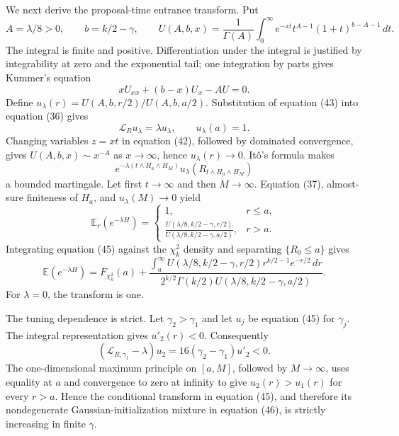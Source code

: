 We next derive the proposal-time entrance transform. Put
\[
 A=\lambda/8>0,\qquad b=k/2-\gamma,\qquad
 U(A,b,x)=\frac1{\Gamma(A)}
 \int_0^\infty e^{-xt}t^{A-1}(1+t)^{b-A-1}\,dt. \tag{42}
\]
The integral is finite and positive. Differentiation under the integral is justified by integrability at zero and the exponential tail; one integration by parts gives Kummer's equation
\[
 xU_{xx}+(b-x)U_x-AU=0. \tag{43}
\]
Define \(u_\lambda(r)=U(A,b,r/2)/U(A,b,a/2)\). Substitution of equation (43) into equation (36) gives
\[
 \mathcal L_Ru_\lambda=\lambda u_\lambda,\qquad u_\lambda(a)=1. \tag{44}
\]
Changing variables \(z=xt\) in equation (42), followed by dominated convergence, gives
\(U(A,b,x)\sim x^{-A}\) as \(x\to\infty\), hence \(u_\lambda(r)\to0\). It\^o's formula makes
\[
 e^{-\lambda(t\wedge H_a\wedge H_M)}
 u_\lambda(R_{t\wedge H_a\wedge H_M})
\]
a bounded martingale. Let first \(t\to\infty\) and then \(M\to\infty\). Equation (37), almost-sure finiteness of \(H_a\), and \(u_\lambda(M)\to0\) yield
\[
 \mathbb E_r(e^{-\lambda H})=
 \begin{cases}
 1,&r\le a,\\[1mm]
 \displaystyle
 \frac{U(\lambda/8,k/2-\gamma,r/2)}
 {U(\lambda/8,k/2-\gamma,a/2)},&r>a.
 \end{cases} \tag{45}
\]
Integrating equation (45) against the \(\chi_k^2\) density and separating \(\{R_0\le a\}\) gives
\[
 \mathbb E(e^{-\lambda H})
 =F_{\chi_k^2}(a)+
 \frac{\displaystyle\int_a^\infty
 U(\lambda/8,k/2-\gamma,r/2)r^{k/2-1}e^{-r/2}\,dr}
 {\displaystyle2^{k/2}\Gamma(k/2)
 U(\lambda/8,k/2-\gamma,a/2)}. \tag{46}
\]
For \(\lambda=0\), the transform is one.

The tuning dependence is strict. Let \(\gamma_2>\gamma_1\) and let \(u_j\) be equation (45) for \(\gamma_j\). The integral representation gives \(u'_2(r)<0\). Consequently
\[
 (\mathcal L_{R,\gamma_1}-\lambda)u_2
 =16(\gamma_2-\gamma_1)u'_2<0. \tag{47}
\]
The one-dimensional maximum principle on \([a,M]\), followed by \(M\to\infty\), uses equality at \(a\) and convergence to zero at infinity to give
\(u_2(r)>u_1(r)\) for every \(r>a\). Hence the conditional transform in equation (45), and therefore its nondegenerate Gaussian-initialization mixture in equation (46), is strictly increasing in finite \(\gamma\).

